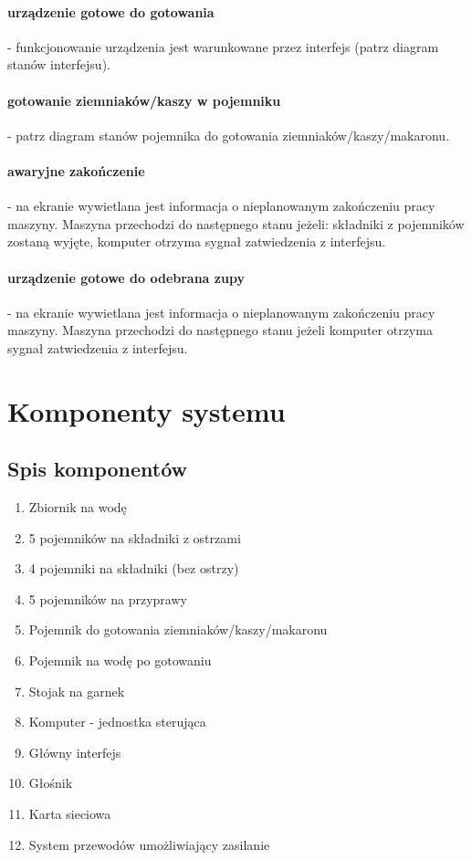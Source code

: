 \documentclass[12pt,a4paper,notitlepage]{article}
\begin{document}
\paragraph{urządzenie gotowe do gotowania} - funkcjonowanie urządzenia jest warunkowane przez interfejs (patrz diagram stanów interfejsu).
\paragraph{gotowanie ziemniaków/kaszy w pojemniku} - patrz diagram stanów pojemnika do gotowania ziemniaków/kaszy/makaronu.
\paragraph{awaryjne zakończenie} - na ekranie wywietlana jest informacja o nieplanowanym zakończeniu pracy maszyny. Maszyna przechodzi do następnego stanu jeżeli: składniki z pojemników zostaną wyjęte, komputer otrzyma sygnał zatwiedzenia z interfejsu.
\paragraph{urządzenie gotowe do odebrana zupy} - na ekranie wywietlana jest informacja o nieplanowanym zakończeniu pracy maszyny. Maszyna przechodzi do następnego stanu jeżeli komputer otrzyma sygnał zatwiedzenia z interfejsu.


\newpage
\section{Komponenty systemu}

\subsection{Spis komponentów}
\begin{enumerate}
  \item Zbiornik na wodę
  \item 5 pojemników na składniki z ostrzami
  \item 4 pojemniki na składniki (bez ostrzy)
  \item 5 pojemników na przyprawy
  \item Pojemnik do gotowania ziemniaków/kaszy/makaronu
  \item Pojemnik na wodę po gotowaniu
  \item Stojak na garnek
  \item Komputer - jednostka sterująca
  \item Główny interfejs
  \item Głośnik
  \item Karta sieciowa
  \item System przewodów umożliwiający zasilanie
\end{enumerate}
\end{document}
